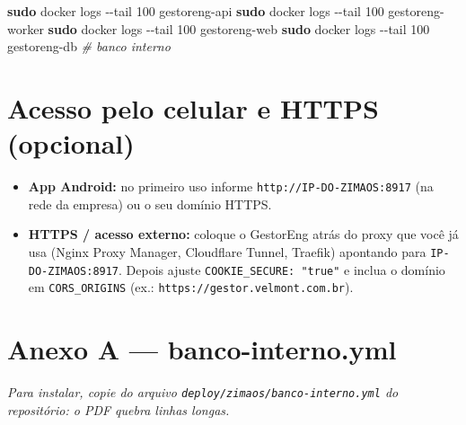\documentclass[
  10pt,
]{article}
\newenvironment{Shaded}{\begin{snugshade}}{\end{snugshade}}
\newcommand{\AttributeTok}[1]{\textcolor[rgb]{0.13,0.29,0.53}{#1}}
\newcommand{\CommentTok}[1]{\textcolor[rgb]{0.56,0.35,0.01}{\textit{#1}}}
\newcommand{\FunctionTok}[1]{\textcolor[rgb]{0.13,0.29,0.53}{\textbf{#1}}}
\newcommand{\NormalTok}[1]{#1}
\providecommand{\tightlist}{%
  \setlength{\itemsep}{0pt}\setlength{\parskip}{0pt}}
\renewenvironment{quote}{\begin{oldquote}\small\itshape}{\end{oldquote}}
\begin{document}
\begin{Shaded}
\begin{Highlighting}[]
\FunctionTok{sudo}\NormalTok{ docker logs }\AttributeTok{{-}{-}tail}\NormalTok{ 100 gestoreng{-}api}
\FunctionTok{sudo}\NormalTok{ docker logs }\AttributeTok{{-}{-}tail}\NormalTok{ 100 gestoreng{-}worker}
\FunctionTok{sudo}\NormalTok{ docker logs }\AttributeTok{{-}{-}tail}\NormalTok{ 100 gestoreng{-}web}
\FunctionTok{sudo}\NormalTok{ docker logs }\AttributeTok{{-}{-}tail}\NormalTok{ 100 gestoreng{-}db      }\CommentTok{\# banco interno}
\end{Highlighting}
\end{Shaded}

\hypertarget{acesso-pelo-celular-e-https-opcional}{%
\section{Acesso pelo celular e HTTPS
(opcional)}\label{acesso-pelo-celular-e-https-opcional}}

\begin{itemize}
\tightlist
\item
  \textbf{App Android:} no primeiro uso informe
  \texttt{http://IP-DO-ZIMAOS:8917} (na rede da empresa) ou o seu
  domínio HTTPS.
\item
  \textbf{HTTPS / acesso externo:} coloque o GestorEng atrás do proxy
  que você já usa (Nginx Proxy Manager, Cloudflare Tunnel, Traefik)
  apontando para \texttt{IP-DO-ZIMAOS:8917}. Depois ajuste
  \texttt{COOKIE\_SECURE:\ "true"} e inclua o domínio em
  \texttt{CORS\_ORIGINS} (ex.: \texttt{https://gestor.velmont.com.br}).
\end{itemize}

\hypertarget{anexo-a-banco-interno.yml}{%
\section{Anexo A ---
banco-interno.yml}\label{anexo-a-banco-interno.yml}}

\begin{quote}
Para instalar, copie do arquivo \texttt{deploy/zimaos/banco-interno.yml}
do repositório: o PDF quebra linhas longas.
\end{quote}
\end{document}
